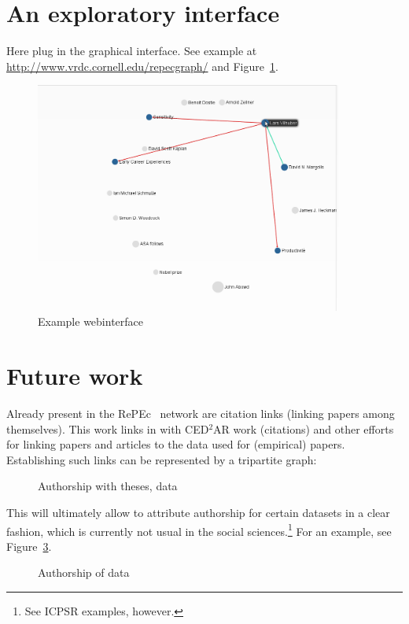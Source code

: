 \documentclass[x11names]{article}
\newcommand{\repec}{RePEc}
\begin{document}
\section{An exploratory interface}
\label{sec:interface}
Here plug in the graphical interface. See example at \url{http://www.vrdc.cornell.edu/repecgraph/} and Figure~\ref{fig:webinterface-pvi26}.
\begin{figure}[ht]
\caption{Example webinterface}\label{fig:webinterface-pvi26}
\includegraphics[width=0.9\textwidth]{web-interface-pvi26}
\end{figure}
\clearpage

\section{Future work}
\label{sec:future_work}
Already present in the \repec~ network are citation links (linking papers among themselves). This work links in with CED$^2$AR work (citations) and other efforts for linking papers and articles to the data used for (empirical) papers. Establishing such links can be represented by a tripartite graph:

\begin{figure}[ht]
\caption{Authorship with theses, data}\label{fig:tripartite}

\end{figure}
This will ultimately allow to attribute authorship for certain datasets in a clear fashion, which is currently not usual in the social sciences.\footnote{See ICPSR examples, however.} For an example, see Figure~\ref{fig:tripartite-hilite}.

\begin{figure}[ht]
\caption{Authorship of data}\label{fig:tripartite-hilite}

\end{figure}
\end{document}
